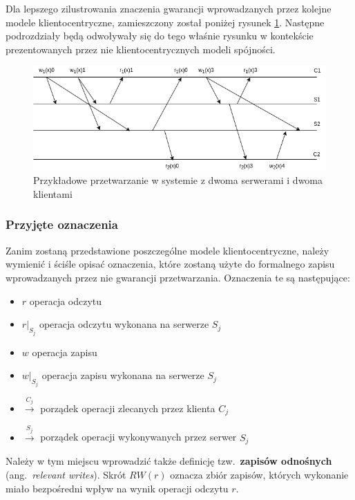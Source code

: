 Dla lepszego zilustrowania znaczenia gwarancji wprowadzanych przez kolejne modele klientocentryczne, zamieszczony został poniżej rysunek \ref{figure:replication_sess_gu}. Następne podrozdziały będą odwoływały się do tego właśnie rysunku w kontekście prezentowanych przez nie klientocentrycznych modeli spójności.

\begin{figure}[H]
    \includegraphics[width=\linewidth]{images/02-sess_gu.png}
    \caption{Przykładowe przetwarzanie w systemie z dwoma serwerami i dwoma klientami}
    \label{figure:replication_sess_gu}
\end{figure}

\subsubsection{Przyjęte oznaczenia}

Zanim zostaną przedstawione poszczególne modele klientocentryczne, należy wymienić i ściśle opisać oznaczenia, które zostaną użyte do formalnego zapisu wprowadzanych przez nie gwarancji przetwarzania. Oznaczenia te są następujące:

\begin{itemize}
    \item $ r $ operacja odczytu
    \item $ r|_{S_j} $ operacja odczytu wykonana na serwerze $ S_j $
    \item $ w $ operacja zapisu
    \item $ w|_{S_j} $ operacja zapisu wykonana na serwerze $ S_j $
    \item $ \xrightarrow{C_j} $ porządek operacji zlecanych przez klienta $ C_j $
    \item $ \xrightarrow{S_j} $ porządek operacji wykonywanych przez serwer $ S_j $
\end{itemize}

Należy w tym miejscu wprowadzić także definicję tzw.\ \textbf{zapisów odnośnych} (ang.\ \textit{relevant writes}). Skrót $ RW(r) $ oznacza zbiór zapisów, których wykonanie miało bezpośredni wpływ na wynik operacji odczytu $ r $.

